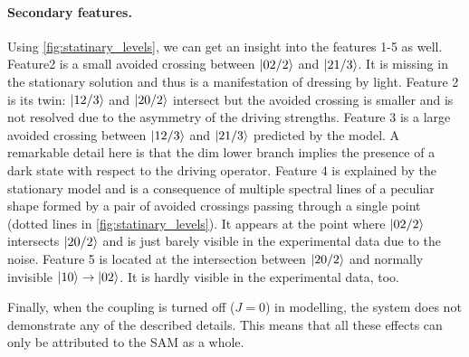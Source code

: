 \documentclass[%
 aip,
 amsmath,amssymb,
 reprint,%
]{revtex4-1}
\begin{document}
\paragraph{Secondary features.} Using \autoref{fig:statinary_levels}, we can get an insight into the features 1-5 as well. Feature2 is a small avoided crossing between $\ket{02/2}$ and $\ket{21/3}$. It is missing in the stationary solution and thus is a manifestation of dressing by light. Feature 2 is its twin: $\ket{12/3}$ and $\ket{20/2}$ intersect but the avoided crossing is smaller and is not resolved due to the asymmetry of the driving strengths. Feature 3 is a large avoided crossing between $\ket{12/3}$ and $\ket{21/3}$ predicted by the model. A remarkable detail here is that the dim lower branch implies the presence of a dark state with respect to the driving operator. Feature 4 is explained by the stationary model and is a consequence of multiple spectral lines of a peculiar shape formed by a pair of avoided crossings passing through a single point (dotted lines in \autoref{fig:statinary_levels}). It appears at the point where $\ket{02/2}$ intersects $\ket{20/2}$ and is just barely visible in the experimental data due to the noise. Feature 5 is located at the intersection between $\ket{20/2}$ and normally invisible $\ket{10}\rightarrow \ket{02}$. It is hardly visible in the experimental data, too. 

Finally, when the coupling is turned off ($J=0$) in modelling, the system does not demonstrate any of the described details. This means that all these effects can only be attributed to the SAM as a whole. 
\end{document}
